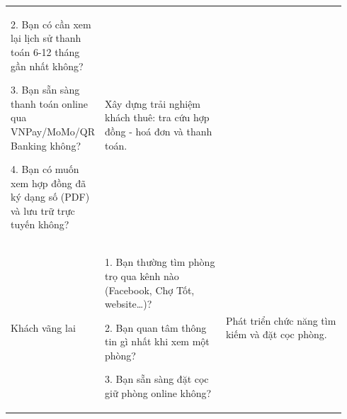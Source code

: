 \begin{longtable}[]{@{}>{\RaggedRight\arraybackslash}p{0.20\linewidth}>{\RaggedRight\arraybackslash}p{0.37\linewidth}>{\RaggedRight\arraybackslash}p{0.37\linewidth}@{}}
\begin{minipage}[t]{\linewidth}
2. Bạn có cần xem lại lịch sử thanh toán 6-12 tháng gần nhất không?

3. Bạn sẵn sàng thanh toán online qua VNPay/MoMo/QR Banking không?

4. Bạn có muốn xem hợp đồng đã ký dạng số (PDF) và lưu trữ trực tuyến
không?\strut
\end{minipage} & \begin{minipage}[t]{\linewidth}\raggedright
Xây dựng trải nghiệm khách thuê: tra cứu hợp đồng - hoá đơn và thanh
toán.\strut
\end{minipage}\tabularnewline
\begin{minipage}[t]{\linewidth}\raggedright
Khách vãng lai\strut
\end{minipage} & \begin{minipage}[t]{\linewidth}\raggedright
1. Bạn thường tìm phòng trọ qua kênh nào (Facebook, Chợ Tốt,
website\ldots)?

2. Bạn quan tâm thông tin gì nhất khi xem một phòng?

3. Bạn sẵn sàng đặt cọc giữ phòng online không?\strut
\end{minipage} & \begin{minipage}[t]{\linewidth}\raggedright
Phát triển chức năng tìm kiếm và đặt cọc phòng.\strut
\end{minipage}\tabularnewline
\bottomrule
\end{longtable}

